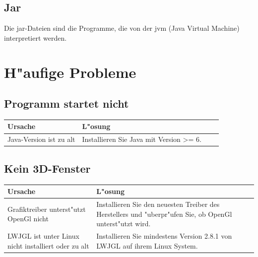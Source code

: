 \documentclass{scrartcl}
\begin{document}
\subsection{Jar}
Die jar-Dateien sind die Programme, die von der jvm (Java Virtual Machine) interpretiert werden.
\newpage
\section{H"aufige Probleme}
\subsection{Programm startet nicht}
\begin{tabular}[b]{|lp{7cm}|lp{7cm}|}
\hline
Ursache & L"osung \\
\hline
Java-Version ist zu alt & Installieren Sie Java mit Version >= 6.\\
\hline
\end{tabular}
\subsection{Kein 3D-Fenster}
\begin{tabular}[b]{|lp{7cm}|lp{7cm}|}
\hline
Ursache & L"osung \\
\hline
Grafiktreiber unterst"utzt OpenGl nicht & Installieren Sie den neuesten Treiber des Herstellers und "uberpr"ufen Sie, ob OpenGl unterst"utzt wird.\\
\hline
LWJGL ist unter Linux nicht installiert oder zu alt & Installieren Sie mindestens Version 2.8.1 von LWJGL auf ihrem Linux System.\\
\hline
\end{tabular}
\end{document}
